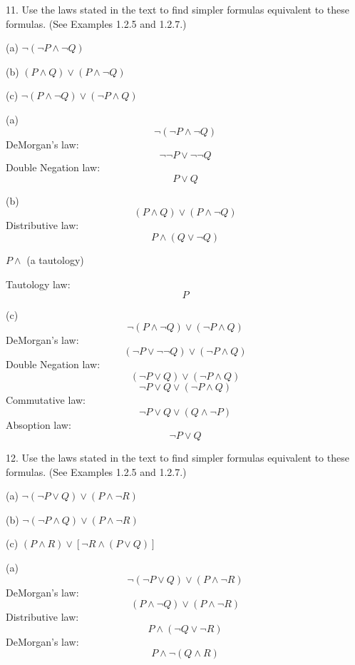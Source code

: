 \documentclass{article}
\begin{document}
\vspace{30pt}

11. Use the laws stated in the text to find simpler formulas equivalent to these
formulas. (See Examples 1.2.5 and 1.2.7.)

\hspace{12pt}(a) $\neg(\neg P \land \neg Q)$

\hspace{12pt}(b) $(P \land Q) \lor (P \land \neg Q)$

\hspace{12pt}(c) $\neg (P \land \neg Q) \lor (\neg P \land Q)$
\vspace{20pt}

(a) $$\neg(\neg P \land \neg Q)$$
DeMorgan's law: $$\neg \neg P \lor \neg \neg Q$$
Double Negation law: $$P \lor Q$$
\vspace{10pt}

(b) $$(P \land Q) \lor (P \land \neg Q)$$
Distributive law: $$P \land (Q \lor \neg Q)$$
\centerline{$P \land$ (a tautology)}

Tautology law: $$P$$
\vspace{10pt}

(c) $$\neg (P \land \neg Q) \lor (\neg P \land Q)$$
DeMorgan's law: $$(\neg P \lor \neg \neg Q) \lor (\neg P \land Q)$$
Double Negation law: $$(\neg P \lor Q) \lor (\neg P \land Q)$$
$$\neg P \lor Q \lor (\neg P \land Q)$$
Commutative law: $$\neg P \lor Q \lor (Q \land \neg P)$$
Absoption law: $$\neg P \lor Q$$

\vspace{30pt}

12. Use the laws stated in the text to find simpler formulas equivalent to these
formulas. (See Examples 1.2.5 and 1.2.7.)

\hspace{12pt}(a) $\neg (\neg P \lor Q) \lor (P \land \neg R)$

\hspace{12pt}(b) $\neg (\neg P \land Q) \lor (P \land \neg R)$

\hspace{12pt}(c) $(P \land R) \lor [\neg R \land (P \lor Q)]$
\vspace{10pt}

(a) $$\neg (\neg P \lor Q) \lor (P \land \neg R)$$
DeMorgan's law: $$(P \land \neg Q) \lor (P \land \neg R)$$
Distributive law: $$P \land (\neg Q \lor \neg R)$$
DeMorgan's law: $$P \land \neg (Q \land R)$$
\vspace{10pt}
\end{document}
